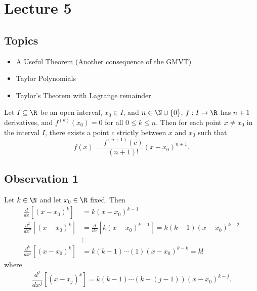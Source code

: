 \section{Lecture 5}

\subsection{Topics}

\begin{itemize}
    \item A Useful Theorem (Another consequence of the GMVT)
    \item Taylor Polynomials
    \item Taylor's Theorem with Lagrange remainder
\end{itemize}

\begin{corollary}
    Let \( I \subseteq  \R   \) be an open interval, \( {x}_{0} \in I  \), and \( n \in \N \cup \{ 0 \}  \), \( f: I \to \R  \) has \( n + 1  \) derivatives, and \( f^{(k)}({x}_{0}) = 0  \) for all \( 0 \leq k \leq n  \). Then for each point \( x \neq {x}_{0} \) in the interval \( I  \), there exists a point \( c  \) strictly between \( x  \) and \( {x}_{0} \) such that 
    \[  f(x) = \frac{ f^{(n+1)}(c) }{ (n+1)! } (x-{x}_{0})^{n+1}. \]
\end{corollary}

\subsection{Observation 1}

Let \( k \in \N  \) and let \( {x}_{0} \in \R  \) fixed. Then
\begin{align*}
    \frac{ d }{ dx } [(x - {x}_{0})^{k}] &= k (x - {x}_{0})^{k-1} \\
    \frac{ d^{2} }{ d x^{2} } [(x- {x}_{0})^{k}] &= \frac{ d  }{  d x  }  [ k (x - {x}_{0})^{k-1}] = k (k - 1) (x - {x}_{0})^{k - 2} \\
                                                 &\vdots \\
    \frac{ d^{k }  }{  d x^{k } }  [(x - {x}_{0})^{k}] &= k (k -1)\cdots (1) (x - {x}_{0})^{k - k} = k!
\end{align*}
where 
\[  \frac{ d^{j} }{  d x^{j } }  [(x - {x}_{j})^{k}] = k (k - 1) \cdots ( k - (j -1)) (x - {x}_{0})^{k - j}.   \]

